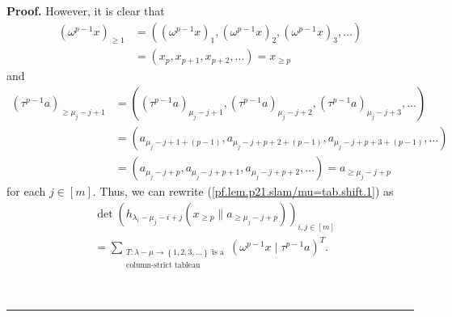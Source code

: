 \documentclass[numbers=enddot,12pt,final,onecolumn,notitlepage]{scrartcl}%
\theoremstyle{definition}
\newenvironment{proof}[1][Proof]{\noindent\textbf{#1.} }{\ \rule{0.5em}{0.5em}}
\let\sumnonlimits\sum
\renewcommand{\sum}{\sumnonlimits\limits}
\begin{document}
\begin{enumerate}
\begin{proof}
However, it is clear that
\begin{align*}
\left(  \omega^{p-1}x\right)  _{\geq1}  &  =\left(  \left(  \omega
^{p-1}x\right)  _{1},\left(  \omega^{p-1}x\right)  _{2},\left(  \omega
^{p-1}x\right)  _{3},\ldots\right) \\
&  =\left(  x_{p},x_{p+1},x_{p+2},\ldots\right)  =x_{\geq p}%
\end{align*}
and
\begin{align*}
\left(  \tau^{p-1}a\right)  _{\geq\mu_{j}-j+1}  &  =\left(  \left(  \tau
^{p-1}a\right)  _{\mu_{j}-j+1},\left(  \tau^{p-1}a\right)  _{\mu_{j}%
-j+2},\left(  \tau^{p-1}a\right)  _{\mu_{j}-j+3},\ldots\right) \\
&  =\left(  a_{\mu_{j}-j+1+\left(  p-1\right)  },a_{\mu_{j}-j+p+2+\left(
p-1\right)  },a_{\mu_{j}-j+p+3+\left(  p-1\right)  },\ldots\right) \\
&  =\left(  a_{\mu_{j}-j+p},a_{\mu_{j}-j+p+1},a_{\mu_{j}-j+p+2},\ldots\right)
=a_{\geq\mu_{j}-j+p}%
\end{align*}
for each $j\in\left[  m\right]  $. Thus, we can rewrite
(\ref{pf.lem.p21.slam/mu=tab.shift.1}) as%
\begin{align}
&  \det\left(  h_{\lambda_{i}-\mu_{j}-i+j}\left(  x_{\geq p}\parallel
a_{\geq\mu_{j}-j+p}\right)  \right)  _{i,j\in\left[  m\right]  }\nonumber\\
&  =\sum_{\substack{T:\lambda-\mu\rightarrow\left\{  1,2,3,\ldots\right\}
\text{ is a}\\\text{column-strict tableau}}}\left(  \omega^{p-1}x\mid
\tau^{p-1}a\right)  ^{T}. \label{pf.lem.p21.slam/mu=tab.shift.2}%
\end{align}



\end{proof}
\end{enumerate}
\end{document}
